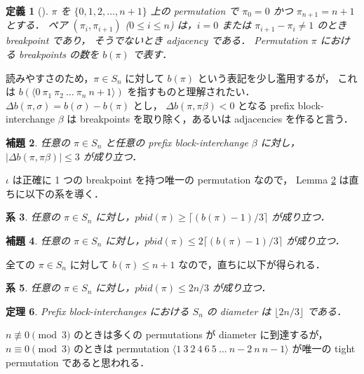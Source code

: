 \documentclass[paper=a4,fontsize=11pt,report,oneside]{jlreq}
\newtheorem{theorem}{定理}[chapter]
\newtheorem{lemma}[theorem]{補題}
\newtheorem{definition}[theorem]{定義}
\newtheorem{corollary}[theorem]{系}
\begin{document}
\begin{definition}[\cite{labarre2011edit}] \label{def:breakpoints}
    $\pi$ を $\{0, 1, 2, \dots, n + 1\}$ 上の permutation で $\pi_0 = 0$ かつ $\pi_{n+1} = n + 1$ とする．
    ペア $(\pi_i, \pi_{i+1})$ ($0 \le i \le n$) は，$i = 0$ または $\pi_{i+1} - \pi_i \neq 1$ のとき breakpoint であり，
    そうでないとき adjacency である．
    Permutation $\pi$ における breakpoints の数を $b(\pi)$ で表す．
\end{definition}

読みやすさのため，$\pi \in S_n$ に対して $b(\pi)$ という表記を少し濫用するが，
これは $b(\langle 0\ \pi_1\ \pi_2\ \dots\ \pi_n\ n + 1 \rangle)$ を指すものと理解されたい．
$\Delta b(\pi, \sigma) = b(\sigma) - b(\pi)$ とし，
$\Delta b(\pi, \pi\beta) < 0$ となる prefix block-interchange $\beta$ は
breakpoints を取り除く，あるいは adjacencies を作ると言う．

\begin{lemma} \label{lem:delta_b_bound}
    任意の $\pi \in S_n$ と任意の prefix block-interchange $\beta$ に対し，
    $|\Delta b(\pi, \pi\beta)| \le 3$ が成り立つ．
\end{lemma}


$\iota$ は正確に 1 つの breakpoint を持つ唯一の permutation なので，
Lemma \ref{lem:delta_b_bound} は直ちに以下の系を導く．

\begin{corollary} \label{cor:lowerbound_breakpoints}
    任意の $\pi \in S_n$ に対し，$pbid(\pi) \ge \lceil (b(\pi) - 1) / 3 \rceil$ が成り立つ．
\end{corollary}

\begin{lemma} \label{lem:upperbound_breakpoints}
    任意の $\pi \in S_n$ に対し，$pbid(\pi) \le 2 \lceil (b(\pi) - 1) / 3 \rceil$ が成り立つ．
\end{lemma}


全ての $\pi \in S_n$ に対して $b(\pi) \le n + 1$ なので，直ちに以下が得られる．

\begin{corollary} \label{cor:upperbound_n}
    任意の $\pi \in S_n$ に対し，$pbid(\pi) \le 2n/3$ が成り立つ．
\end{corollary}

\begin{theorem} \label{thm:diameter}
    Prefix block-interchanges における $S_n$ の diameter は $\lfloor 2n/3 \rfloor$ である．
\end{theorem}


$n \not\equiv 0 \pmod 3$ のときは多くの permutations が diameter に到達するが，
$n \equiv 0 \pmod 3$ のときは permutation $\langle 1\ 3\ 2\ 4\ 6\ 5\ \dots\ n - 2\ n\ n - 1 \rangle$
が唯一の tight permutation であると思われる．


\nocite{*}

\end{document}
